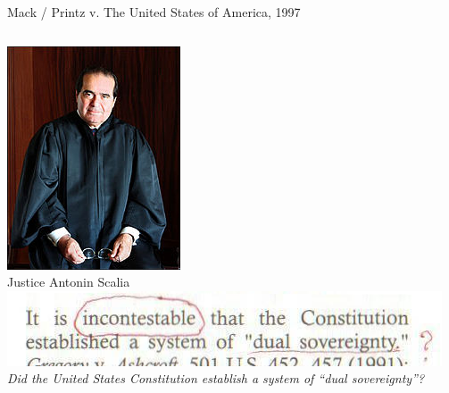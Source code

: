 \begin{frame}{Mack / Printz v. The United States of America, 1997}
    \begin{columns}[onlytextwidth]
            \centering
            \includegraphics[height=0.75\textheight]{img/scalia.jpg} \\
            Justice Antonin Scalia \\

            \includegraphics[width=\textwidth]{img/incontestable.png} \\
            \pause
            {
                \color{red}
                \emph{Did the United States Constitution establish a system of ``dual sovereignty''?}
            }
    \end{columns}
\end{frame}

